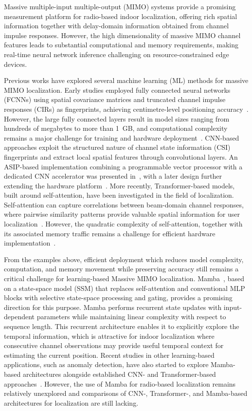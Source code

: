 \documentclass[lettersize,journal]{IEEEtran}
\begin{document}
Massive multiple-input multiple-output (MIMO) systems provide a promising measurement platform for radio-based indoor localization, offering rich spatial information together with delay-domain information obtained from channel impulse responses. However, the high dimensionality of massive MIMO channel features leads to substantial computational and memory requirements, making real-time neural network inference challenging on resource-constrained edge devices.

Previous works have explored several machine learning (ML) methods for massive MIMO localization. 
Early studies employed fully connected neural networks (FCNNs) using spatial covariance matrices and truncated channel impulse responses (CIRs) as fingerprints, achieving centimetre-level positioning accuracy~\cite{TianICC2023}. However, the large fully connected layers result in model sizes ranging from hundreds of megabytes to more than 1~GB, and computational complexity remains a major challenge for training and hardware deployment~\cite{Tian2024}.
CNN-based approaches exploit the structured nature of channel state information (CSI) fingerprints and extract local spatial features through convolutional layers. An ASIP-based implementation combining a programmable vector processor with a dedicated CNN accelerator was presented in~\cite{AttariISCAS2021}, with a later design further extending the hardware platform~\cite{AttariASIP2025}.
More recently, Transformer-based models, built around self-attention, have been investigated in the field of localization. Self-attention can capture correlations between beam-domain 
channel responses, where pairwise similarity patterns provide valuable spatial information for 
user localization~\cite{Tian2024Attention}. However, the quadratic complexity of self-attention, together with its associated memory traffic remains a challenge for efficient hardware implementation~\cite{YamanTransformer2026}.

From the examples above, efficient deployment which reduces model complexity, computation, and 
memory movement while preserving accuracy still remains a critical challenge for
learning-based Massive MIMO localization. Mamba~\cite{Mamba2023}, based on a state-space model (SSM) that  replaces self-attention and conventional MLP blocks with selective state-space processing and gating, provides a
promising direction for this purpose. Mamba performs recurrent state updates with
input-dependent parameters while maintaining linear complexity with respect to
sequence length. This recurrent architecture enables it to explicitly explore the temporal information, which is attractive for indoor
localization where consecutive channel observations may provide useful temporal context for estimating the current position. Recent studies in other learning-based applications, such as anomaly detection, have also started to explore Mamba-based architectures alongside established CNN- and Transformer-based approaches~\cite{MambaAD2024}. However, the use of Mamba for radio-based localization remains relatively unexplored and comparisons of CNN-, Transformer-, and Mamba-based architectures for localization are still lacking.
\end{document}
